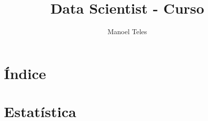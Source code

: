 \documentclass[12pt,a4paper]{article}
\begin{document}
	
\title{Data Scientist - Curso}
\author{Manoel Teles}
	

\maketitle	

\newpage

\section{Índice}

\newpage

\section{Estatística}




	
\end{document}
